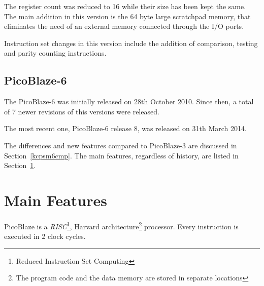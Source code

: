         The register count was reduced to 16 while their size has been kept the same. The main addition in this version is the 64 byte large scratchpad memory, that eliminates the need of an external memory connected through the I/O ports.

        Instruction set changes in this version include the addition of comparison, testing and parity counting instructions.\cite{PicoBlaze3}

        \subsection{PicoBlaze-6}

        The PicoBlaze-6 was initially released on 28th October 2010. Since then, a total of 7 newer revisions of this versions were released.

        The most recent one, PicoBlaze-6 release 8, was released on 31th March 2014.\cite{PicoBlaze6}

        The differences and new features compared to PicoBlaze-3 are discussed in Section~\ref{kcpsm6cmp}. The main features, regardless of history, are listed in Section~\ref{mainfeatures}.

    \section{Main Features}\label{mainfeatures}

    PicoBlaze is a \emph{RISC}\footnote{Reduced Instruction Set Computing}, Harvard architecture\footnote{The program code and the data memory are stored in separate locations} processor. Every instruction is executed in 2 clock cycles.\cite{PicoBlazeWeb}\cite{PicoBlaze6}


